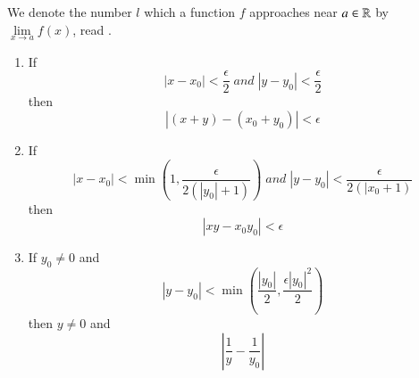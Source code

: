 \documentclass[12pt, a4paper, oneside, openright, titlepage]{book}
\begin{document}
\begin{nota}
    We denote the number $l$ which a function $f$ approaches near $a \in \mathbb R$ by $\lim\limits_{x\rightarrow a}f(x)$, read .
\end{nota}


\begin{lem}
    \leavevmode
    \begin{enumerate}
        \item If $$|x-x_0| < \frac{\epsilon}{2}\;and\;|y-y_0| < \frac{\epsilon}{2}$$
            then $$|(x+y) - (x_0+y_0)| < \epsilon$$
        \item If $$|x-x_0| < \min\left(1,\frac{\epsilon}{2(|y_0|+1)}\right)\;and\;|y-y_0| < \frac{\epsilon}{2(|x_0+1)}$$
            then $$|xy-x_0y_0| < \epsilon$$
        \item If $y_0 \neq 0$ and $$|y-y_0| < \min\left(\frac{|y_0|}{2},\frac{\epsilon|y_0|^2}{2}\right)$$
            then $y\neq 0$ and $$\left|\frac{1}{y} - \frac{1}{y_0}\right|$$
    \end{enumerate}
\end{lem}
\end{document}
